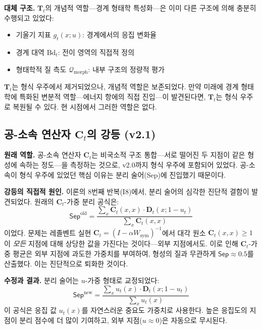 \textbf{대체 구조.} $\mathbf{T}_t$의 개념적 역할---경계 형태학 특성화---은 이미 다른 구조에 의해 충분히 수행되고 있었다:
\begin{itemize}
    \item 기울기 지표 $g_t(x; u)$: 경계에서의 응집 변화율
    \item 경계 대역 $\mathrm{Bd}_t$: 전이 영역의 직접적 정의
    \item 형태학적 질 측도 $\mathcal{Q}_{\mathrm{morph}}$: 내부 구조의 정량적 평가
\end{itemize}

$\mathbf{T}_t$는 형식 우주에서 제거되었으나, 개념적 역할은 보존되었다. 만약 미래에 경계 형태학에 특화된 변분적 역할---에너지 항에의 직접 진입---이 발견된다면, $\mathbf{T}_t$는 형식 우주로 복원될 수 있다. 현 시점에서 그러한 역할은 없다.


\subsection{공-소속 연산자 $\mathbf{C}_t$의 강등 (v2.1)}

\textbf{원래 역할.} 공-소속 연산자 $\mathbf{C}_t$는 비국소적 구조 통합---서로 떨어진 두 지점이 같은 형성에 속하는 정도---을 측정하는 것으로, v2.0까지 형식 우주에 포함되어 있었다. 공-소속이 형식 우주에 있었던 핵심 이유는 분리 술어(Sep)에 진입했기 때문이다.

\textbf{강등의 직접적 원인.} 이론의 8번째 반복(I8)에서, 분리 술어의 심각한 진단적 결함이 발견되었다. 원래의 $\mathbf{C}_t$-가중 분리 공식은:
\begin{equation}
    \mathsf{Sep}^{\text{old}} = \frac{\sum_x \mathbf{C}_t(x,x) \cdot \mathbf{D}_t(x; 1-u_t)}{\sum_x \mathbf{C}_t(x,x)}
    \label{eq:sep-old}
\end{equation}
이었다. 문제는 레졸벤트 실현 $\mathbf{C}_t = (I - \alpha W_{\mathrm{sym}})^{-1}$에서 대각 원소 $\mathbf{C}_t(x,x) \geq 1$이 \emph{모든} 지점에 대해 상당한 값을 가진다는 것이다---외부 지점에서도. 이로 인해 $\mathbf{C}_t$-가중 평균은 외부 지점에 과도한 가중치를 부여하여, 형성의 질과 무관하게 $\mathsf{Sep} \approx 0.5$를 산출했다. 이는 진단적으로 퇴화한 것이다.

\textbf{수정과 결과.} 분리 술어는 $u$-가중 형태로 교정되었다:
\begin{equation}
    \mathsf{Sep}^{\text{new}} = \frac{\sum_x u_t(x) \cdot \mathbf{D}_t(x; 1-u_t)}{\sum_x u_t(x)}
    \label{eq:sep-new}
\end{equation}
이 공식은 응집 값 $u_t(x)$를 자연스러운 중요도 가중치로 사용한다. 높은 응집도의 지점이 분리 점수에 더 많이 기여하고, 외부 지점($u \approx 0$)은 자동으로 무시된다.


